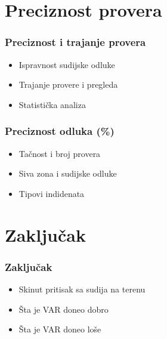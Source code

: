\documentclass{beamer}
\begin{document}
\section{Preciznost provera}

\begin{frame}
  \frametitle{Preciznost i trajanje provera}
  \begin{itemize}
    \item  Ispravnost sudijske odluke
    \item  Trajanje provere i pregleda
    \item  Statistička analiza
  \end{itemize}
\end{frame}

\begin{frame}
  \frametitle{Preciznost odluka (\%)}
  \begin{itemize}
    \item  Tačnost i broj provera
    \item  Siva zona i sudijske odluke
    \item  Tipovi indidenata
  \end{itemize}
\end{frame}

\section{Zaključak}

\begin{frame}
  \frametitle{Zaključak}
  \begin{itemize}
    \item  Skinut pritisak sa sudija na terenu
    \item  Šta je VAR doneo dobro
    \item  Šta je VAR doneo loše
  \end{itemize}
\end{frame}
\end{document}
